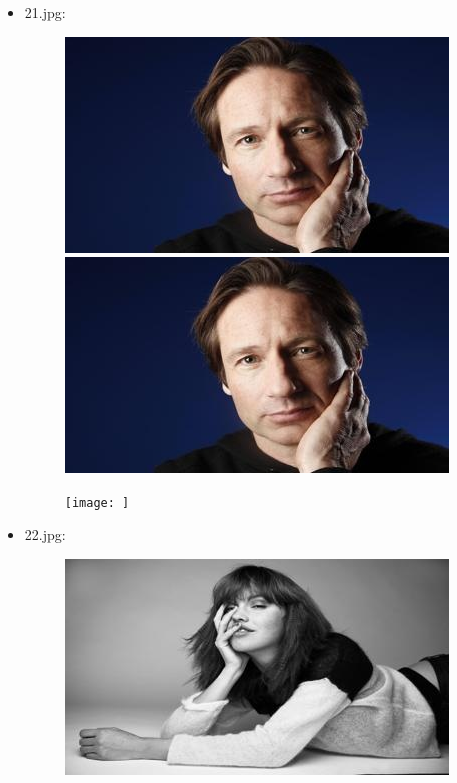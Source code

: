 \begin{itemize}
\begin{figure}[!htb]
        \end{figure}
    \item 21.jpg:
        \begin{figure}[!htb]
            \begin{minipage}{0.33\textwidth}
            \centering
            \includegraphics[scale = 0.45]{images/results/original/21.jpg}
            \end{minipage}\hfill
            \begin{minipage}{0.33\textwidth}
                \centering
                \includegraphics[scale = 0.45]{images/results/detection/21_detections.jpg}
            \end{minipage}\hfill
            \begin{minipage}{0.33\textwidth}
                \centering
                \texttt{[image: ]}
            \end{minipage}
        \end{figure}
    \item 22.jpg:
        \begin{figure}[!htb]
            \begin{minipage}{0.33\textwidth}
            \centering
            \includegraphics[scale = 0.45]{images/results/original/22.jpg}

\end{minipage}
\end{figure}
\end{itemize}
